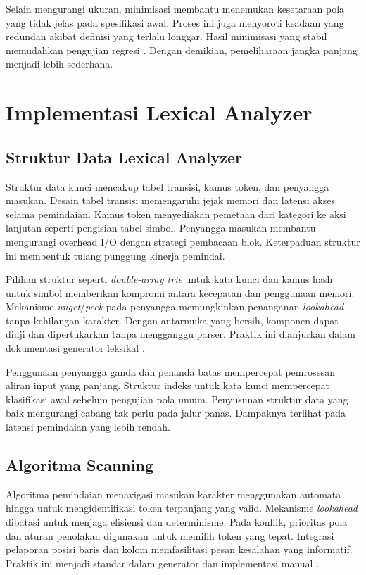\documentclass[../main.tex]{subfiles}
\begin{document}
Selain mengurangi ukuran, minimisasi membantu menemukan kesetaraan pola yang tidak jelas pada spesifikasi awal. Proses ini juga menyoroti keadaan yang redundan akibat definisi yang terlalu longgar. Hasil minimisasi yang stabil memudahkan pengujian regresi \citep{WikiDFAMin}. Dengan demikian, pemeliharaan jangka panjang menjadi lebih sederhana.

\section{Implementasi Lexical Analyzer}
\subsection{Struktur Data Lexical Analyzer}
Struktur data kunci mencakup tabel transisi, kamus token, dan penyangga masukan. Desain tabel transisi memengaruhi jejak memori dan latensi akses selama pemindaian. Kamus token menyediakan pemetaan dari kategori ke aksi lanjutan seperti pengisian tabel simbol. Penyangga masukan membantu mengurangi overhead I/O dengan strategi pembacaan blok. Keterpaduan struktur ini membentuk tulang punggung kinerja pemindai.

Pilihan struktur seperti \emph{double-array trie} untuk kata kunci dan kamus hash untuk simbol memberikan kompromi antara kecepatan dan penggunaan memori. Mekanisme \emph{unget}/\emph{peek} pada penyangga memungkinkan penanganan \emph{lookahead} tanpa kehilangan karakter. Dengan antarmuka yang bersih, komponen dapat diuji dan dipertukarkan tanpa mengganggu parser. Praktik ini dianjurkan dalam dokumentasi generator leksikal \citep{FlexManual}.

Penggunaan penyangga ganda dan penanda batas mempercepat pemrosesan aliran input yang panjang. Struktur indeks untuk kata kunci mempercepat klasifikasi awal sebelum pengujian pola umum. Penyusunan struktur data yang baik mengurangi cabang tak perlu pada jalur panas. Dampaknya terlihat pada latensi pemindaian yang lebih rendah.

\subsection{Algoritma Scanning}
Algoritma pemindaian menavigasi masukan karakter menggunakan automata hingga untuk mengidentifikasi token terpanjang yang valid. Mekanisme \emph{lookahead} dibatasi untuk menjaga efisiensi dan determinisme. Pada konflik, prioritas pola dan aturan penolakan digunakan untuk memilih token yang tepat. Integrasi pelaporan posisi baris dan kolom memfasilitasi pesan kesalahan yang informatif. Praktik ini menjadi standar dalam generator dan implementasi manual \citep{FlexManual}.
\end{document}
